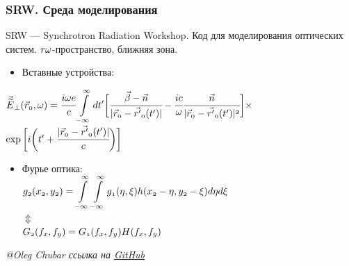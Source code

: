 \documentclass[14pt, hyperref = {colorlinks}]{beamer}
\begin{document}
\small
\begin{frame}
\frametitle{SRW. Среда моделирования}\label{t1}
SRW --- Synchrotron Radiation Workshop. Код для моделирования оптических систем.
$\mathnormal{r\omega}$-пространство, ближняя зона.\\
\begin{itemize}
	\item Вставные устройства:\\
\end{itemize}
	\hspace{25pt}$\mathnormal{\vec{\widetilde{E}}_{\bot}(\vec{r}_0, \omega) = 
	\cfrac{i\omega e}{c}\displaystyle\int\limits_{-\infty}^{\infty} dt'\bigg[\cfrac{\vec{\beta} - \vec{n}}{|\vec{r}_0 - \vec{r'}_0(t')|} - \cfrac{ic}{\omega}\cfrac{\vec{n}}{|\vec{r}_0 - \vec{r'}_0(t')|^2}\bigg]\times}$\\
	\hspace{195pt}$\mathnormal{\exp\bigg[i\bigg(t' + \cfrac{|\vec{r}_0 - \vec{r'}_0(t')|}{c}\bigg)\bigg]}$

\begin{itemize}	
	\item Фурье оптика:\\
	\centering
	\vspace{-10pt}
	$\mathnormal{g_2(x_2, y_2) = \displaystyle\int\limits_{-\infty}^{\infty}\displaystyle\int\limits_{-\infty}^{\infty}
		g_1(\eta, \xi) h(x_2 - \eta, y_2 - \xi)}d\eta d\xi$ \\
	\vspace{-6pt}
	$\Updownarrow$\\
	\vspace{6pt}
	$\mathnormal{G_2(f_x, f_y) = G_1(f_x, f_y)H(f_x, f_y)}$
\end{itemize}
\tiny{\textit{@Oleg Chubar ссылка на \href{https://github.com/ochubar/SRW.git}{GitHub}}}
\end{frame}
\end{document}

